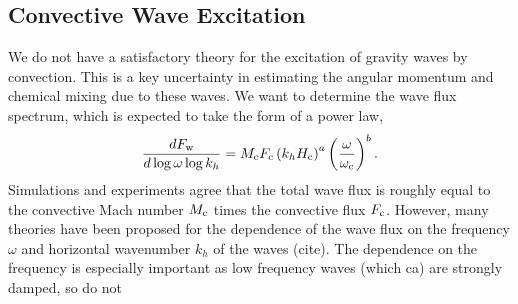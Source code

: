 {\color{purple}
\subsection{Convective Wave Excitation}
}

We do not have a satisfactory theory for the excitation of gravity waves by convection. This is a key uncertainty in estimating the angular momentum and chemical mixing due to these waves. We want to determine the wave flux spectrum, which is expected to take the form of a power law,
\begin{equation}
\frac{d F_{\rm w}}{d\log \omega \log k_h} = M_{\rm c}F_{\rm c} \left(k_h H_{\rm c}\right)^{a} \left(\frac{\omega}{\omega_{\rm c}}\right)^{b}.
\end{equation}
Simulations and experiments agree that the total wave flux is roughly equal to the convective Mach number $M_{\rm c}$ times the convective flux $F_{\rm c}$. However, many theories have been proposed for the dependence of the wave flux on the frequency $\omega$ and horizontal wavenumber $k_h$ of the waves (cite). The dependence on the frequency is especially important as low frequency waves (which ca) are strongly damped, so do not
